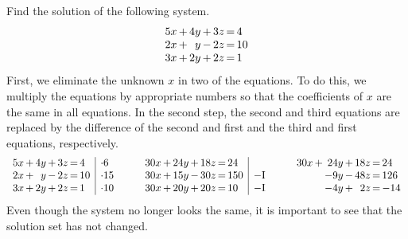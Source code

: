 \documentclass[12pt,eng]{skript_ogg}
\begin{document}
\begin{beispiel}
Find the solution of the following system.
\[\begin{array}{r@{\,}c@{\,}r@{\,}c@{\,}r@{\,}c@{\,}l}
5x & + & 4y & + & 3z & = & 4\\
2x & + & y  & - & 2z & = & 10\\
3x & + & 2y & + & 2z & = & 1
\end{array}\]
First, we eliminate the unknown $x$ in two of the equations. To do this, we multiply the equations by appropriate numbers so that the coefficients of $x$ are the same in all equations. In the second step, the second and third equations are replaced by the difference of the second and first and the third and first equations, respectively.
\[\begin{array}{r@{\,}c@{\,}r@{\,}c@{\,}r@{\,}c@{\,}l|l}
5x & + & 4y & + & 3z & = & 4 & \cdot 6\\
2x & + & y  & - & 2z & = & 10 & \cdot 15\\
3x & + & 2y & + & 2z & = & 1 & \cdot 10
\end{array}\quad\quad\begin{array}{r@{\,}c@{\,}r@{\,}c@{\,}r@{\,}c@{\,}l|l}
30x & + & 24y & + & 18z & = & 24 &  \\
30x & + & 15y & - & 30z & = & 150 & -\mbox{I}\\
30x & + & 20y & + & 20z & = & 10 & -\mbox{I}
\end{array}\quad\quad\begin{array}{r@{\,}c@{\,}r@{\,}c@{\,}r@{\,}c@{\,}l}
30x & + & 24y & + & 18z & = & 24 \\
    &   & -9y & - & 48z & = & 126 \\
    &   & -4y & + & 2z  & = & -14 
		\end{array}\]
Even though the system no longer looks the same, it is important to see that the solution set has not changed. 


\end{beispiel}
\end{document}
